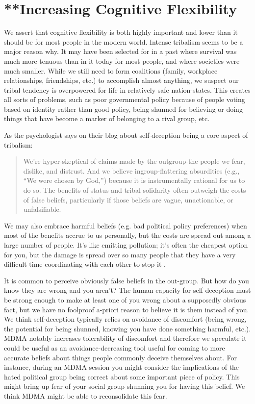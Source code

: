 \documentclass[12pt,letterpaper]{book}
\begin{document}
\section{**Increasing Cognitive Flexibility}
We assert that cognitive flexibility is both highly important and lower than it should be for most people in the modern world. Intense tribalism seems to be a major reason why. It may have been selected for in a past where survival was much more tenuous than in it today for most people, and where societies were much smaller. While we still need to form coalitions (family, workplace relationships, friendships, etc.) to accomplish almost anything, we suspect our tribal tendency is overpowered for life in relatively safe nation-states. This creates all sorts of problems, such as poor governmental policy because of people voting based on identity \cite{klein2020Polarized} rather than good policy, being shunned for believing or doing things that have become a marker of belonging to a rival group, etc.

As the psychologist \textcite{pinsof2024Truth} says on their blog about self-deception being a core aspect of tribalism:
\begin{quotation}
	We're hyper-skeptical of claims made by the outgroup-the people we fear, dislike, and distrust. And we believe ingroup-flattering absurdities (e.g., “We were chosen by God,”) because it is instrumentally rational for us to do so. The benefits of status and tribal solidarity often outweigh the costs of false beliefs, particularly if those beliefs are vague, unactionable, or unfalsifiable.
\end{quotation}
We may also embrace harmful beliefs (e.g. bad political policy preferences) when most of the benefits accrue to us personally, but the costs are spread out among a large number of people. It's like emitting pollution; it's often the cheapest option for you, but the damage is spread over so many people that they have a very difficult time coordinating with each other to stop it \cite{coaseTheorem}.

It is common to perceive obviously false beliefs in the out-group. But how do you know they are wrong and you aren't? The human capacity for self-deception must be strong enough to make at least one of you wrong about a supposedly obvious fact, but we have no foolproof a-priori reason to believe it is them instead of you. We think self-deception typically relies on avoidance of discomfort (being wrong, the potential for being shunned, knowing you have done something harmful, etc.). MDMA notably increases tolerability of discomfort and therefore we speculate it could be useful as an avoidance-decreasing tool useful for coming to more accurate beliefs about things people commonly deceive themselves about. For instance, during an MDMA session you might consider the implications of the hated political group being correct about some important piece of policy. This might bring up fear of your social group shunning you for having this belief. We think MDMA might be able to reconsolidate this fear.
\end{document}
